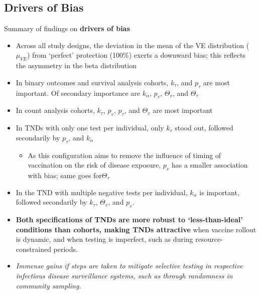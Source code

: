 \documentclass[aspectratio=169]{beamer}
\begin{document}
\subsection{Drivers of Bias}
\begin{frame}{Summary of findings on \textbf{drivers of bias}}
	\footnotesize
	\begin{itemize}
		\item Across all study designs, the deviation in the mean of the VE distribution ($\mu_{VE}$) from `perfect' protection (100\%) exerts a downward bias; this reflects the asymmetry in the beta distribution
		\item In binary outcomes and survival analysis cohorts, $k_\tau$, and $p_\tau$ are most important. Of secondary importance are $k_\alpha$, $p_v$, $\Theta_v$, and $\Theta_{\tau}$
		\item In count analysis cohorts, $k_\tau$, $p_v$, $p_\tau$, and $\Theta_{v}$ are most important
		\item In TNDs with only one test per individual, only $k_\tau$ stood out, followed secondarily by $p_\tau$, and $k_\alpha$
		\begin{itemize}
			\scriptsize
			\item As this configuration aims to remove the influence of timing of vaccination on the risk of disease exposure, $p_v$ has a smaller association with bias; same goes for$\Theta_{\tau}$
		\end{itemize}
		\item In the TND with multiple negative tests per individual, $k_\alpha$ is important, followed secondarily by $k_\tau$, $\Theta_{v}$, and $p_v$.
		\item \textbf{Both specifications of TNDs are more robust to `less-than-ideal' conditions than cohorts, making TNDs attractive} when vaccine rollout is dynamic, and when testing is imperfect, such as during resource-constrained periods.
		\item \textit{Immense gains if steps are taken to mitigate selective testing in respective infectious disease surveillance systems, such as through randomness in community sampling.}
	\end{itemize}
\end{frame}
\end{document}
